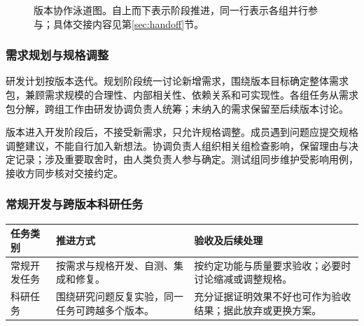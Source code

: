 \documentclass[11pt,a4paper]{article}
\begin{document}
\begin{figure}[H]
\caption{版本协作泳道图。自上而下表示阶段推进，同一行表示各组并行参与；具体交接内容见第\ref{sec:handoff}节。}
\label{fig:swim}
\end{figure}

\subsubsection{需求规划与规格调整}
研发计划按版本迭代。规划阶段统一讨论新增需求，围绕版本目标确定整体需求包，兼顾需求规模的合理性、内部相关性、依赖关系和可实现性。各组任务从需求包分解，跨组工作由研发协调负责人统筹；未纳入的需求保留至后续版本讨论。

版本进入开发阶段后，不接受新需求，只允许规格调整。成员遇到问题应提交规格调整建议，不能自行加入新想法。协调负责人组织相关组检查影响，保留理由与决定记录；涉及重要取舍时，由人类负责人参与确定。测试组同步维护受影响用例，接收方同步核对交接约定。

\subsubsection{常规开发与跨版本科研任务}
\begin{longtable}{L{27mm}L{64mm}L{63mm}}
\toprule
任务类别 & 推进方式 & 验收及后续处理\\\midrule\endhead
常规开发任务 & 按需求与规格开发、自测、集成和修复。 & 按约定功能与质量要求验收；必要时讨论缩减或调整规格。\\
科研任务 & 围绕研究问题反复实验，同一任务可跨越多个版本。 & 充分证据证明效果不好也可作为验收结果；据此放弃或更换方案。\\\bottomrule
\end{longtable}
\end{document}

